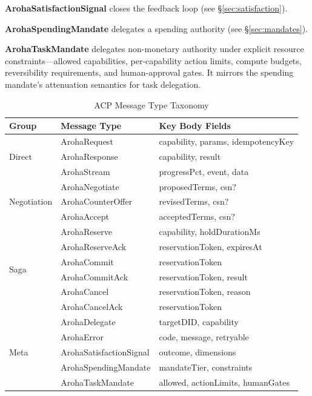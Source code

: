 \documentclass[conference]{IEEEtran}
\begin{document}
\textbf{ArohaSatisfactionSignal} closes the feedback loop
(see \S\ref{sec:satisfaction}).

\textbf{ArohaSpendingMandate} delegates a spending authority
(see \S\ref{sec:mandates}).

\textbf{ArohaTaskMandate} delegates non-monetary authority under
explicit resource constraints---allowed capabilities, per-capability
action limits, compute budgets, reversibility requirements, and
human-approval gates.  It mirrors the spending mandate's attenuation
semantics for task delegation.

\begin{table}[t]
\centering
\caption{ACP Message Type Taxonomy}
\label{tab:messages}
{\small
\begin{tabular}{@{}llp{3.0cm}@{}}
\toprule
\textbf{Group} & \textbf{Message Type} & \textbf{Key Body Fields} \\
\midrule
\multirow{3}{*}{Direct}
  & ArohaRequest      & capability, params, idempotencyKey \\
  & ArohaResponse     & capability, result \\
  & ArohaStream       & progressPct, event, data \\
\midrule
\multirow{3}{*}{Negotiation}
  & ArohaNegotiate    & proposedTerms, csn? \\
  & ArohaCounterOffer & revisedTerms, csn? \\
  & ArohaAccept       & acceptedTerms, csn? \\
\midrule
\multirow{6}{*}{Saga}
  & ArohaReserve      & capability, holdDurationMs \\
  & ArohaReserveAck   & reservationToken, expiresAt \\
  & ArohaCommit       & reservationToken \\
  & ArohaCommitAck    & reservationToken, result \\
  & ArohaCancel       & reservationToken, reason \\
  & ArohaCancelAck    & reservationToken \\
\midrule
\multirow{5}{*}{Meta}
  & ArohaDelegate          & targetDID, capability \\
  & ArohaError             & code, message, retryable \\
  & ArohaSatisfactionSignal & outcome, dimensions \\
  & ArohaSpendingMandate   & mandateTier, constraints \\
  & ArohaTaskMandate       & allowed, actionLimits, humanGates \\
\bottomrule
\end{tabular}
}
\end{table}
\end{document}
